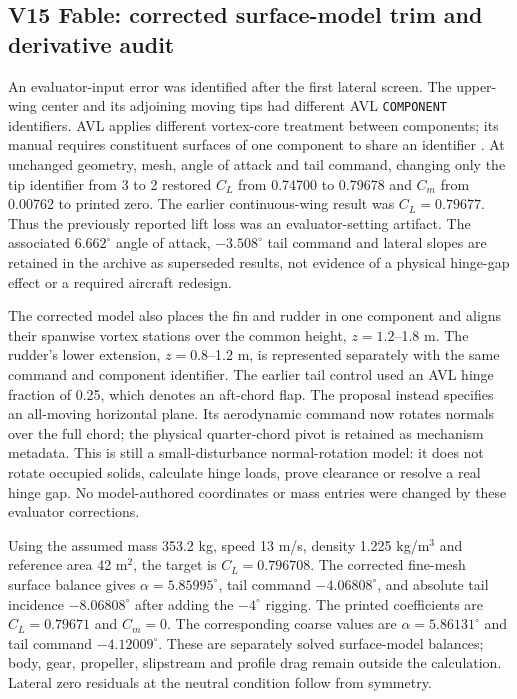 \subsection{V15 Fable: corrected surface-model trim and derivative audit}
\label{sec:v15-fable-lateral}

An evaluator-input error was identified after the first lateral screen.
The upper-wing center and its adjoining moving tips had different AVL
\texttt{COMPONENT} identifiers. AVL applies different vortex-core treatment
between components; its manual requires constituent surfaces of one component
to share an identifier \cite{ref22}. At unchanged geometry, mesh, angle of
attack and tail command, changing only the tip identifier from 3 to 2 restored
$C_L$ from 0.74700 to 0.79678 and $C_m$ from 0.00762 to printed zero.
The earlier continuous-wing result was $C_L=0.79677$. Thus the previously
reported lift loss was an evaluator-setting artifact. The associated
$6.662^\circ$ angle of attack, $-3.508^\circ$ tail command and lateral slopes
are retained in the archive as superseded results, not evidence of a physical
hinge-gap effect or a required aircraft redesign.

The corrected model also places the fin and rudder in one component and
aligns their spanwise vortex stations over the common height, $z=1.2$--1.8 m.
The rudder's lower extension, $z=0.8$--1.2 m, is represented separately with
the same command and component identifier. The earlier tail control used
an AVL hinge fraction of 0.25, which denotes an aft-chord flap. The proposal
instead specifies an all-moving horizontal plane. Its aerodynamic command
now rotates normals over the full chord; the physical quarter-chord pivot
is retained as mechanism metadata. This is still a small-disturbance
normal-rotation model: it does not rotate occupied solids, calculate hinge
loads, prove clearance or resolve a real hinge gap. No model-authored
coordinates or mass entries were changed by these evaluator corrections.

Using the assumed mass 353.2 kg, speed 13 m/s, density 1.225 kg/m$^3$ and
reference area 42 m$^2$, the target is $C_L=0.796708$.
The corrected fine-mesh surface balance gives $\alpha=5.85995^\circ$, tail command $-4.06808^\circ$, and absolute tail incidence $-8.06808^\circ$ after adding the $-4^\circ$ rigging. The printed coefficients are $C_L=0.79671$ and $C_m=0$. The corresponding coarse values are $\alpha=5.86131^\circ$ and tail command $-4.12009^\circ$. These are separately solved surface-model balances; body, gear, propeller, slipstream and profile drag remain outside the calculation. Lateral zero residuals at the neutral condition follow from symmetry.

